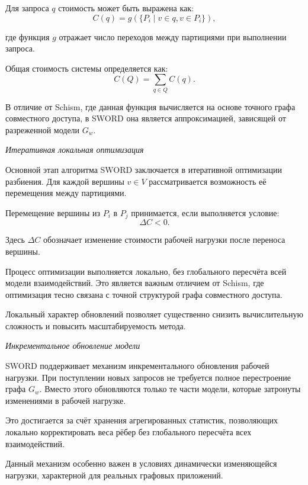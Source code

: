 Для запроса $q$ стоимость может быть выражена как:
\begin{equation*}
C(q) = g(\{P_i \mid v \in q, v \in P_i\}),
\end{equation*}

где функция $g$ отражает число переходов между партициями при выполнении запроса.

Общая стоимость системы определяется как:
\begin{equation*}
C(Q) = \sum_{q \in Q} C(q).
\end{equation*}

В отличие от Schism, где данная функция вычисляется на основе точного графа совместного доступа, в SWORD она является аппроксимацией, зависящей от разреженной модели $G_w$.

\textit{Итеративная локальная оптимизация}

Основной этап алгоритма SWORD заключается в итеративной оптимизации разбиения. Для каждой вершины $v \in V$ рассматривается возможность её перемещения между партициями.

Перемещение вершины из $P_i$ в $P_j$ принимается, если выполняется условие:
\begin{equation*}
\Delta C < 0.
\end{equation*}

Здесь $\Delta C$ обозначает изменение стоимости рабочей нагрузки после переноса вершины.

Процесс оптимизации выполняется локально, без глобального пересчёта всей модели взаимодействий. Это является важным отличием от Schism, где оптимизация тесно связана с точной структурой графа совместного доступа.

Локальный характер обновлений позволяет существенно снизить вычислительную сложность и повысить масштабируемость метода.

\textit{Инкрементальное обновление модели}

SWORD поддерживает механизм инкрементального обновления рабочей нагрузки. При поступлении новых запросов не требуется полное перестроение графа $G_w$. Вместо этого обновляются только те части модели, которые затронуты изменениями в рабочей нагрузке.

Это достигается за счёт хранения агрегированных статистик, позволяющих локально корректировать веса рёбер без глобального пересчёта всех взаимодействий.

Данный механизм особенно важен в условиях динамически изменяющейся нагрузки, характерной для реальных графовых приложений.

